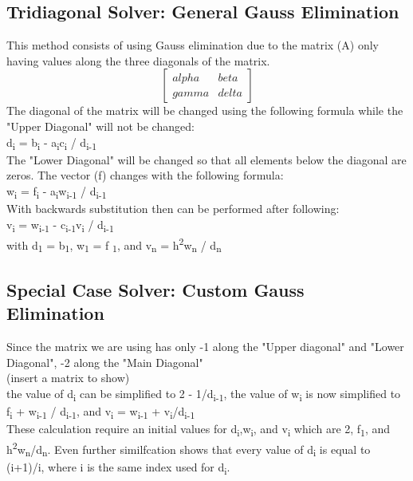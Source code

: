 \documentclass[12pt]{article}
\begin{document}
\subsection{Tridiagonal Solver: General Gauss Elimination}
This method consists of using Gauss elimination due to the matrix (A) only having values along the three diagonals of the matrix.\\
$$
\begin{bmatrix}
alpha& beta\\
gamma& delta
\end{bmatrix}
$$
The diagonal of the matrix will be changed using the following formula while the "Upper Diagonal" will not be changed:\\
d\textsubscript{i} = b\textsubscript{i} - a\textsubscript{i}c\textsubscript{i} / d\textsubscript{i-1}\\
The "Lower Diagonal" will be changed so that all elements below the diagonal are zeros. The vector (f) changes with the following formula:\\
w\textsubscript{i} = f\textsubscript{i} - a\textsubscript{i}w\textsubscript{i-1} / d\textsubscript{i-1}\\
With backwards substitution then can be performed after following:\\
v\textsubscript{i} = w\textsubscript{i-1} - c\textsubscript{i-1}v\textsubscript{i} / d\textsubscript{i-1}\\
\centering with d\textsubscript{1} = b\textsubscript{1}, w\textsubscript{1} = f \textsubscript{1}, and v\textsubscript{n} = h\textsuperscript{2}w\textsubscript{n} / d\textsubscript{n}

\subsection{Special Case Solver: Custom Gauss Elimination}
Since the matrix we are using has only -1 along the "Upper diagonal" and "Lower Diagonal", -2 along the "Main Diagonal" \\
(insert a matrix to show)\\
the value of d\textsubscript{i} can be simplified to 2 - 1/d\textsubscript{i-1}, the value of w\textsubscript{i} is now simplified to  f\textsubscript{i} + w\textsubscript{i-1} / d\textsubscript{i-1}, and v\textsubscript{i} = w\textsubscript{i-1} + v\textsubscript{i}/d\textsubscript{i-1}\\
These calculation require an initial values for d\textsubscript{i},w\textsubscript{i}, and v\textsubscript{i} which are 2, f\textsubscript{1}, and h\textsuperscript{2}w\textsubscript{n}/d\textsubscript{n}. Even further similfcation shows that every value of d\textsubscript{i} is equal to (i+1)/i, where i is the same index used for d\textsubscript{i}. 
\end{document}
